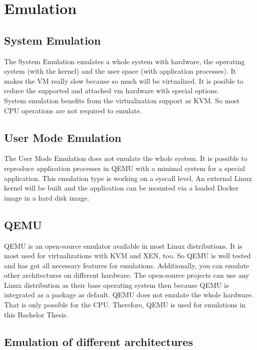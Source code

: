 \chapter{Emulation}\label{ch:emulation}

\section{System Emulation}

The System Emulation emulates a whole system with hardware, the operating system (with the kernel) and the user space (with application processes). It makes the VM really slow because so much will be virtualized. It is posible to reduce the supported and attached vm hardware with special options. \\
System emulation benefits from the virtualization support as KVM. So most CPU operations are not required to emulate.

\section{User Mode Emulation}

The User Mode Emulation does not emulate the whole system. It is possible to reproduce application processes in QEMU with a minimal system for a special application. This emulation type is working on a syscall level. An external Linux kernel will be built and the application can be mounted via a loaded Docker image in a hard disk image. 

\section{QEMU}

QEMU is an open-source emulator available in most Linux distributions. It is most used for virtualizations with KVM and XEN, too. So QEMU is well tested and has got all necessary features for emulations. Additionally, you can emulate other architectures on different hardware. The open-source projects can use any Linux distribution as their base operating system then because QEMU is integrated as a package as default. QEMU does not emulate the whole hardware. That is only possible for the CPU. Therefore, QEMU is used for emulations in this Bachelor Thesis.

\section{Emulation of different architectures}

